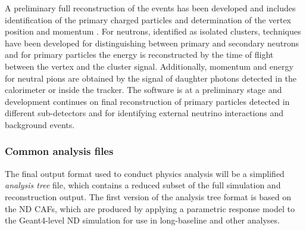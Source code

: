\documentclass[../main-v1.tex]{subfiles}
\begin{document}
A preliminary full reconstruction of the events has been developed and includes identification of the primary charged particles and determination of the vertex position and momentum . For neutrons, identified as isolated clusters, techniques have been developed for distinguishing between primary and secondary neutrons and for primary particles the energy is reconstructed by the time of flight between the vertex and the cluster signal. Additionally, momentum and energy for neutral pions are obtained by the signal of daughter photons detected in the calorimeter or inside the tracker.
The software is at a preliminary stage and development continues on final reconstruction of primary particles detected in different sub-detectors and for identifying external neutrino interactions and background events.

\subsubsection{Common analysis files}

The final output format used to conduct physics analysis will be a simplified
{\it analysis tree} file, which contains a reduced subset of the full simulation
and reconstruction output. The first version of the analysis tree format is
based on the ND CAFs, which are produced by applying a parametric response
model to the Geant4-level ND simulation for use in long-baseline and other analyses.
\end{document}
